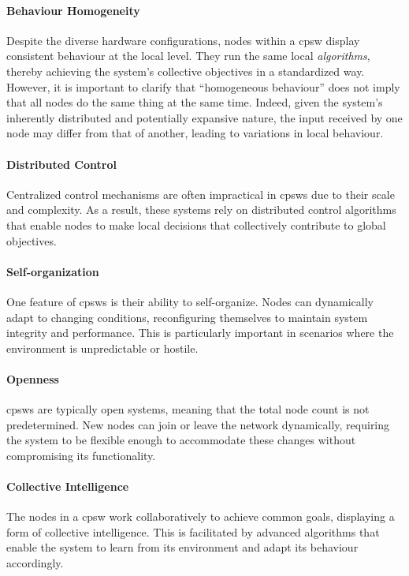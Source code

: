 \paragraph*{Behaviour Homogeneity}
Despite the diverse hardware configurations, 
 nodes within a \ac{cpsw} display consistent behaviour at the local level.
 They run the same local \emph{algorithms}, thereby achieving the system's collective objectives in a standardized way. 
 However, it is important to clarify that ``homogeneous behaviour'' does not imply that all nodes do the same thing at the same time.
 Indeed, given the system's inherently distributed and potentially expansive nature, 
 the input received by one node may differ from that of another, 
 leading to variations in local behaviour.

\paragraph*{Distributed Control}
Centralized control mechanisms are often impractical in \acp{cpsw} due to their scale and complexity. 
 As a result, these systems rely on distributed control algorithms that enable nodes to make local decisions that collectively contribute to global objectives.

\paragraph*{Self-organization}
One feature of \acp{cpsw} is their ability to self-organize. 
Nodes can dynamically adapt to changing conditions, reconfiguring themselves to maintain system integrity and performance. 
This is particularly important in scenarios where the environment is unpredictable or hostile.

\paragraph*{Openness}
\acp{cpsw} are typically open systems, meaning that the total node count is not predetermined. 
New nodes can join or leave the network dynamically, requiring the system to be flexible enough to accommodate these changes without compromising its functionality.

\paragraph*{Collective Intelligence}
The nodes in a \ac{cpsw} work collaboratively to achieve common goals, displaying a form of collective intelligence. 
This is facilitated by advanced algorithms that enable the system to learn from its environment and adapt its behaviour accordingly.


